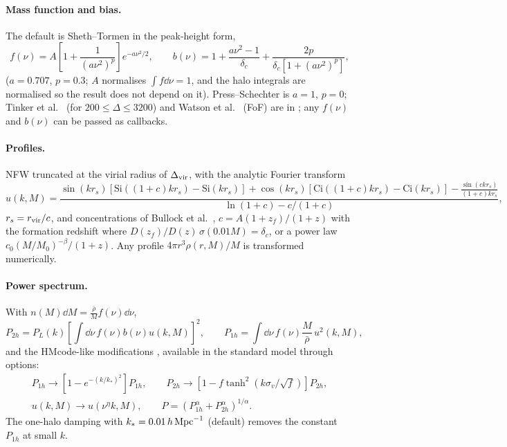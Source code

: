 \paragraph*{Mass function and bias.} The default is Sheth--Tormen \cite{ShethTormen1999} in the peak-height form,
\begin{equation}
f(\nu)=A\left[1+\frac{1}{(a\nu^2)^p}\right]e^{-a\nu^2/2},\qquad
b(\nu)=1+\frac{a\nu^2-1}{\delta_c}+\frac{2p}{\delta_c[1+(a\nu^2)^p]},
\end{equation}
($a=0.707$, $p=0.3$; $A$ normalises $\int f\dd\nu=1$, and the halo integrals are normalised so the result does not
depend on it). Press--Schechter \cite{PressSchechter1974} is $a=1$, $p=0$; Tinker et al.\ \cite{Tinker2008} (for
$200\le\Delta\le3200$) and Watson et al.\ \cite{Watson2013} (FoF) are in ; any $f(\nu)$ and $b(\nu)$
can be passed as callbacks.

\paragraph*{Profiles.} NFW \cite{NFW1997} truncated at the virial radius of $\Delta_{\rm vir}$, with the analytic Fourier
transform
\begin{equation}
u(k,M)=\frac{\sin(kr_s)\left[\mathrm{Si}((1+c)kr_s)-\mathrm{Si}(kr_s)\right]+\cos(kr_s)\left[\mathrm{Ci}((1+c)kr_s)-\mathrm{Ci}(kr_s)\right]-\frac{\sin(ckr_s)}{(1+c)kr_s}}{\ln(1+c)-c/(1+c)},
\end{equation}
$r_s=r_{\rm vir}/c$, and concentrations of Bullock et al.\ \cite{Bullock2001}, $c=A(1+z_f)/(1+z)$ with the formation
redshift where $D(z_f)/D(z)\,\sigma(0.01M)=\delta_c$, or a power law $c_0(M/M_0)^{-\beta}/(1+z)$. Any profile
$4\pi r^3\rho(r,M)/M$ is transformed numerically.

\paragraph*{Power spectrum.} With $n(M)\dd M=\frac{\bar\rho}{M}f(\nu)\dd\nu$,
\begin{equation}
P_{2h}=P_L(k)\left[\int\dd\nu\,f(\nu)b(\nu)u(k,M)\right]^2,\qquad
P_{1h}=\int\dd\nu\,f(\nu)\frac{M}{\bar\rho}\,u^2(k,M),
\end{equation}
and the HMcode-like modifications \cite{Mead2015}, available in the standard model through options:
\begin{gather}
P_{1h}\to\left[1-e^{-(k/k_*)^2}\right]P_{1h},\qquad P_{2h}\to\left[1-f\tanh^2\!\left(k\sigma_v/\sqrt f\right)\right]P_{2h},\\
u(k,M)\to u(\nu^\eta k,M),\qquad P=\left(P_{1h}^\alpha+P_{2h}^\alpha\right)^{1/\alpha}.
\end{gather}
The one-halo damping with $k_*=0.01\,h\,\mathrm{Mpc}^{-1}$ (default) removes the constant $P_{1h}$ at small $k$.

